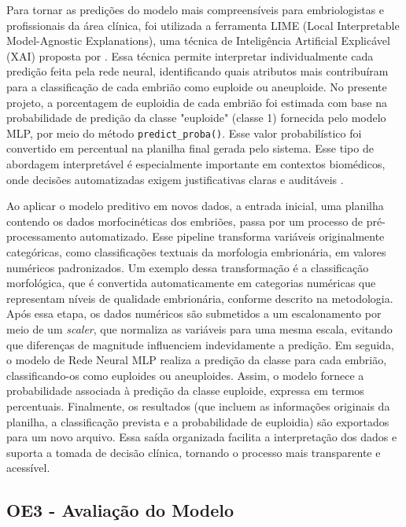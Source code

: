 Para tornar as predições do modelo mais compreensíveis para embriologistas e profissionais da área clínica, foi utilizada a ferramenta LIME (Local Interpretable Model-Agnostic Explanations), uma técnica de Inteligência Artificial Explicável (XAI) proposta por . Essa técnica permite interpretar individualmente cada predição feita pela rede neural, identificando quais atributos mais contribuíram para a classificação de cada embrião como euploide ou aneuploide. No presente projeto, a porcentagem de euploidia de cada embrião foi estimada com base na probabilidade de predição da classe "euploide" (classe 1) fornecida pelo modelo MLP, por meio do método \texttt{predict\_proba()}. Esse valor probabilístico foi convertido em percentual  na planilha final gerada pelo sistema. Esse tipo de abordagem interpretável é especialmente importante em contextos biomédicos, onde decisões automatizadas exigem justificativas claras e auditáveis \cite{arrieta2020, ribeiro2016}.

Ao aplicar o modelo preditivo em novos dados, a entrada inicial, uma planilha contendo os dados morfocinéticas dos embriões, passa por um processo de pré-processamento automatizado. Esse pipeline transforma variáveis originalmente categóricas, como classificações textuais da morfologia embrionária, em valores numéricos padronizados. Um exemplo dessa transformação é a classificação morfológica, que é convertida automaticamente em categorias numéricas que representam níveis de qualidade embrionária, conforme descrito na metodologia. Após essa etapa, os dados numéricos são submetidos a um escalonamento por meio de um \textit{scaler}, que normaliza as variáveis para uma mesma escala, evitando que diferenças de magnitude influenciem indevidamente a predição. Em seguida, o modelo de Rede Neural MLP realiza a predição da classe para cada embrião, classificando-os como euploides ou aneuploides. Assim, o modelo fornece a probabilidade associada à predição da classe euploide, expressa em termos percentuais. Finalmente, os resultados (que incluem as informações originais da planilha, a classificação prevista e a probabilidade de euploidia) são exportados para um novo arquivo. Essa saída organizada facilita a interpretação dos dados e suporta a tomada de decisão clínica, tornando o processo mais transparente e acessível.

\subsection{OE3 - Avaliação do Modelo}

